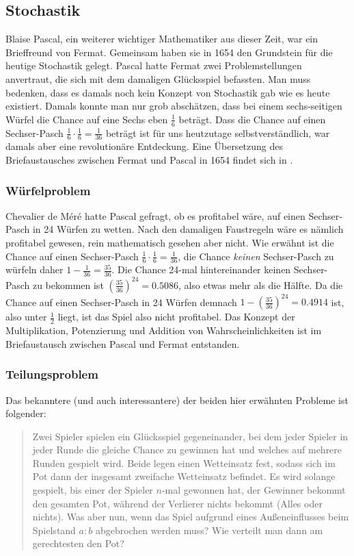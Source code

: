 \subsection{Stochastik} \label{sec:stochastik}
Blaise Pascal, ein weiterer wichtiger Mathematiker aus dieser Zeit, war ein Brieffreund von Fermat. Gemeinsam haben sie in 1654 den Grundstein für die heutige \Gls{Stochastik} gelegt. Pascal hatte Fermat zwei Problemstellungen anvertraut, die sich mit dem damaligen Glücksspiel befassten. Man muss bedenken, dass es damals noch kein Konzept von Stochastik gab wie es heute existiert. Damals konnte man nur grob abschätzen, dass bei einem sechs-seitigen Würfel die Chance auf eine Sechs eben $\frac{1}{6}$ beträgt. Dass die Chance auf einen Sechser-Pasch $\frac{1}{6} \cdot \frac{1}{6} = \frac{1}{36}$ beträgt ist für uns heutzutage selbstverständlich, war damals aber eine revolutionäre Entdeckung. Eine Übersetzung des Briefaustausches zwischen Fermat und Pascal in 1654 findet sich in \cite{fermatPascalProb}.

\subsubsection{Würfelproblem}
Chevalier de Méré hatte Pascal gefragt, ob es profitabel wäre, auf einen Sechser-Pasch in 24 Würfen zu wetten. Nach den damaligen Faustregeln wäre es nämlich profitabel gewesen, rein mathematisch gesehen aber nicht. Wie erwähnt ist die Chance auf einen Sechser-Pasch $\frac{1}{6} \cdot \frac{1}{6} = \frac{1}{36}$, die Chance \textit{keinen} Sechser-Pasch zu würfeln daher $1 - \frac{1}{36} = \frac{35}{36}$. Die Chance 24-mal hintereinander keinen Sechser-Pasch zu bekommen ist $(\frac{35}{36})^{24} = 0.5086$, also etwas mehr als die Hälfte. Da die Chance auf einen Sechser-Pasch in 24 Würfen demnach $1-(\frac{35}{36})^{24}=0.4914$ ist, also unter $\frac{1}{2}$ liegt, ist das Spiel also nicht profitabel. Das Konzept der Multiplikation, Potenzierung und Addition von Wahrscheinlichkeiten ist im Briefaustausch zwischen Pascal und Fermat entstanden.

\subsubsection{Teilungsproblem}
Das bekanntere (und auch interessantere) der beiden hier erwähnten Probleme ist folgender:

\begin{quote}
    Zwei Spieler spielen ein Glücksspiel gegeneinander, bei dem jeder Spieler in jeder Runde die gleiche Chance zu gewinnen hat und welches auf mehrere Runden gespielt wird. Beide legen einen Wetteinsatz fest, sodass sich im Pot dann der insgesamt zweifache Wetteinsatz befindet. Es wird solange gespielt, bis einer der Spieler $n$-mal gewonnen hat, der Gewinner bekommt den gesamten Pot, während der Verlierer nichts bekommt (Alles oder nichts). Was aber nun, wenn das Spiel aufgrund eines Außeneinflusses beim Spielstand $a:b$ abgebrochen werden muss? Wie verteilt man dann am gerechtesten den Pot?
\end{quote}

